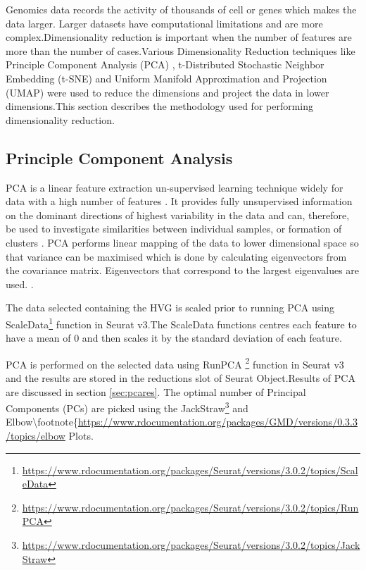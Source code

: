 \documentclass{sydneythesis}
\begin{document}
Genomics data records the activity of thousands of cell or genes which
makes the data larger. Larger datasets have computational limitations
and are more complex.Dimensionality reduction is important when the
number of features are more than the number of cases.Various
Dimensionality Reduction techniques like Principle Component Analysis
(PCA) \autocite{wold1987principal}, t-Distributed Stochastic Neighbor
Embedding (t-SNE) \autocite{maaten2008visualizing} and Uniform Manifold
Approximation and Projection (UMAP) \autocite{maaten2008visualizing}
were used to reduce the dimensions and project the data in lower
dimensions.This section describes the methodology used for performing
dimensionality reduction.

\subsection{Principle Component
Analysis}\label{principle-component-analysis}

PCA is a linear feature extraction un-supervised learning technique
widely for data with a high number of features
\autocite{wold1987principal}. It provides fully unsupervised information
on the dominant directions of highest variability in the data and can,
therefore, be used to investigate similarities between individual
samples, or formation of clusters \autocite{ringner2008principal}. PCA
performs linear mapping of the data to lower dimensional space so that
variance can be maximised which is done by calculating eigenvectors from
the covariance matrix. Eigenvectors that correspond to the largest
eigenvalues are used. \autocite{wold1987principal}.

The data selected containing the HVG is scaled prior to running PCA
using
ScaleData\footnote{\url{https://www.rdocumentation.org/packages/Seurat/versions/3.0.2/topics/ScaleData}}
function in Seurat v3.The ScaleData functions centres each feature to
have a mean of 0 and then scales it by the standard deviation of each
feature.

PCA is performed on the selected data using RunPCA
\footnote{\url{https://www.rdocumentation.org/packages/Seurat/versions/3.0.2/topics/RunPCA}}
function in Seurat v3 and the results are stored in the reductions slot
of Seurat Object.Results of PCA are discussed in section
\ref{sec:pcares}. The optimal number of Principal Components (PCs) are
picked using the
JackStraw\footnote{\url{https://www.rdocumentation.org/packages/Seurat/versions/3.0.2/topics/JackStraw}}
and
Elbow\textbackslash{}footnote\{\url{https://www.rdocumentation.org/packages/GMD/versions/0.3.3/topics/elbow}
Plots.
\end{document}
